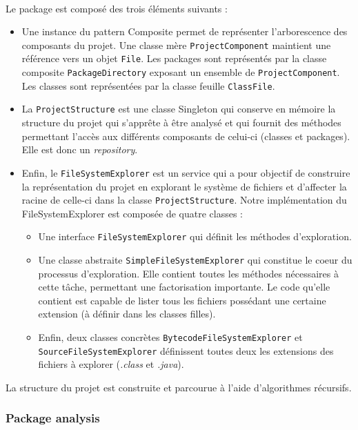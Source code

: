 \documentclass{scrartcl}
\begin{document}
	\paragraph{}Le package est composé des trois éléments suivants :
	\begin{itemize}
		\item Une instance du pattern Composite permet de représenter l’arborescence des composants du projet. Une classe mère \texttt{ProjectComponent} maintient une référence vers un objet \texttt{File}. Les packages sont représentés par la classe composite \texttt{PackageDirectory} exposant un ensemble de \texttt{ProjectComponent}. Les classes sont représentées par la classe feuille \texttt{ClassFile}.
		\item La \texttt{ProjectStructure} est une classe Singleton qui conserve en mémoire la structure du projet qui s’apprête à être analysé et qui fournit des méthodes permettant l’accès aux différents composants de celui-ci (classes et packages). Elle est donc un \emph{repository}.
		\item Enfin, le \texttt{FileSystemExplorer} est un service qui a pour objectif de construire la représentation du projet en explorant le système de fichiers et d’affecter la racine de celle-ci dans la classe \texttt{ProjectStructure}. Notre implémentation du FileSystemExplorer est composée de quatre classes :
		\begin{itemize}
		    \item Une interface \texttt{FileSystemExplorer} qui définit les méthodes d'exploration.
		    \item Une classe abstraite \texttt{SimpleFileSystemExplorer} qui constitue le coeur du processus d'exploration. Elle contient toutes les méthodes nécessaires à cette tâche, permettant une factorisation importante. Le code qu'elle contient est capable de lister tous les fichiers possédant une certaine extension (à définir dans les classes filles).
		    \item Enfin, deux classes concrètes \texttt{BytecodeFileSystemExplorer} et \texttt{SourceFileSystemExplorer} définissent toutes deux les extensions des fichiers à explorer (\emph{.class} et \emph{.java}).
		\end{itemize}
	\end{itemize}
    La structure du projet est construite et parcourue à l'aide d’algorithmes récursifs.
    
\subsubsection{Package analysis}
\end{document}
